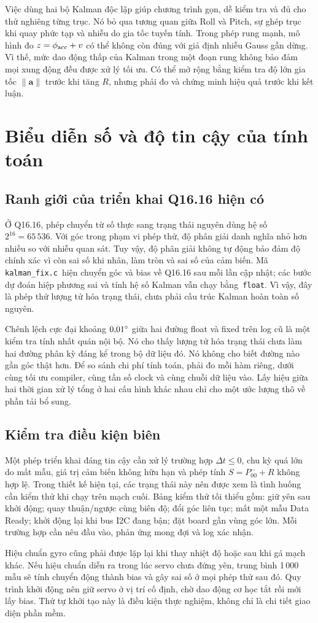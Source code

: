 Việc dùng hai bộ Kalman độc lập giúp chương trình gọn, dễ kiểm tra và đủ cho thử nghiêng từng trục. Nó bỏ qua tương quan giữa Roll và Pitch, sự ghép trục khi quay phức tạp và nhiễu do gia tốc tuyến tính. Trong phép rung mạnh, mô hình đo $z=\phi_{\rm acc}+v$ có thể không còn đúng với giả định nhiễu Gauss gần dừng. Vì thế, mức dao động thấp của Kalman trong một đoạn rung không bảo đảm mọi xung động đều được xử lý tối ưu. Có thể mở rộng bằng kiểm tra độ lớn gia tốc $\lVert\mathbf a\rVert$ trước khi tăng $R$, nhưng phải đo và chứng minh hiệu quả trước khi kết luận.

\section{Biểu diễn số và độ tin cậy của tính toán}
\subsection{Ranh giới của triển khai Q16.16 hiện có}
Ở Q16.16, phép chuyển từ số thực sang trạng thái nguyên dùng hệ số $2^{16}=65\,536$. Với góc trong phạm vi phép thử, độ phân giải danh nghĩa nhỏ hơn nhiều so với nhiễu quan sát. Tuy vậy, độ phân giải không tự động bảo đảm độ chính xác vì còn sai số khi nhân, làm tròn và sai số của cảm biến. Mã \,\texttt{kalman\_fix.c}\, hiện chuyển góc và bias về Q16.16 sau mỗi lần cập nhật; các bước dự đoán hiệp phương sai và tính hệ số Kalman vẫn chạy bằng \,\texttt{float}. Vì vậy, đây là phép thử lượng tử hóa trạng thái, chưa phải cấu trúc Kalman hoàn toàn số nguyên.

Chênh lệch cực đại khoảng $0{,}01^{\circ}$ giữa hai đường float và fixed trên log cũ là một kiểm tra tính nhất quán nội bộ. Nó cho thấy lượng tử hóa trạng thái chưa làm hai đường phân kỳ đáng kể trong bộ dữ liệu đó. Nó không cho biết đường nào gần góc thật hơn. Để so sánh chi phí tính toán, phải đo mỗi hàm riêng, dưới cùng tối ưu compiler, cùng tần số clock và cùng chuỗi dữ liệu vào. Lấy hiệu giữa hai thời gian xử lý tổng ở hai cấu hình khác nhau chỉ cho một ước lượng thô về phần tải bổ sung.

\subsection{Kiểm tra điều kiện biên}
Một phép triển khai đáng tin cậy cần xử lý trường hợp $\Delta t\leq0$, chu kỳ quá lớn do mất mẫu, giá trị cảm biến không hữu hạn và phép tính $S=P_{00}^{-}+R$ không hợp lệ. Trong thiết kế hiện tại, các trạng thái này nên được xem là tình huống cần kiểm thử khi chạy trên mạch cuối. Bảng kiểm thử tối thiểu gồm: giữ yên sau khởi động; quay thuận/ngược cùng biên độ; đổi góc liên tục; mất một mẫu Data Ready; khởi động lại khi bus I2C đang bận; đặt board gần vùng góc lớn. Mỗi trường hợp cần nêu đầu vào, phản ứng mong đợi và log xác nhận.

Hiệu chuẩn gyro cũng phải được lặp lại khi thay nhiệt độ hoặc sau khi gá mạch khác. Nếu hiệu chuẩn diễn ra trong lúc servo chưa đứng yên, trung bình 1\,000 mẫu sẽ tính chuyển động thành bias và gây sai số ở mọi phép thử sau đó. Quy trình khởi động nên giữ servo ở vị trí cố định, chờ dao động cơ học tắt rồi mới lấy bias. Thứ tự khởi tạo này là điều kiện thực nghiệm, không chỉ là chi tiết giao diện phần mềm.
